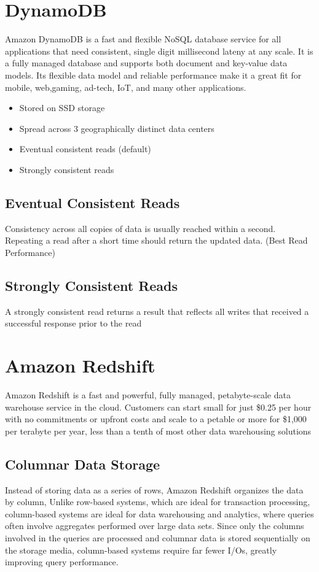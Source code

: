 \documentclass{article}
\begin{document}
\section{DynamoDB}
Amazon DynamoDB is a fast and flexible NoSQL database service for all applications that need consistent, single digit millisecond lateny at any scale. It is a fully managed database and supports both document and key-value data models. Its flexible data model and reliable performance make it a great fit for mobile, web,gaming, ad-tech, IoT, and many other applications.

\begin{itemize}
\item
Stored on SSD storage

\item
Spread across 3 geographically distinct data centers

\item
Eventual consistent reads (default)

\item
Strongly consistent reads
\end{itemize}

\subsection{Eventual Consistent Reads}
Consistency across all copies of data is usually reached within a second. Repeating a read after a short time should return the updated data. (Best Read Performance)

\subsection{Strongly Consistent Reads}
A strongly consistent read returns a result that reflects all writes that received a successful response prior to the read

\section{Amazon Redshift}
Amazon Redshift is a fast and powerful, fully managed, petabyte-scale data warehouse service in the cloud. Customers can start small for just \$0.25 per hour with no commitments or upfront costs and scale to a petable or more for \$1,000 per terabyte per year, less than a tenth of most other data warehousing solutions

\subsection{Columnar Data Storage}
Instead of storing data as a series of rows, Amazon Redshift organizes the data by column, Unlike row-based systems, which are ideal for transaction processing, column-based systems are ideal for data warehousing and analytics, where queries often involve aggregates performed over large data sets. Since only the columns involved in the queries are processed and columnar data is stored sequentially on the storage media, column-based systems require far fewer I/Os, greatly improving query performance.
\end{document}
